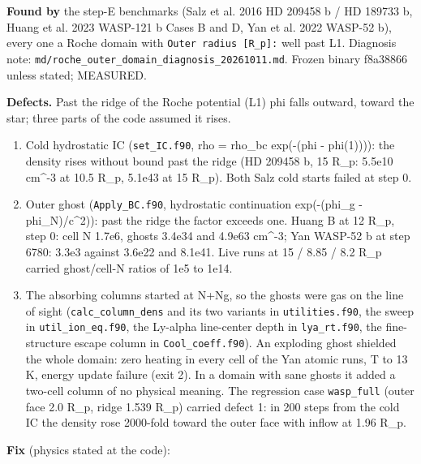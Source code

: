 \documentclass[english,a4paper]{my_memo}
\providecommand{\tightlist}{\setlength{\itemsep}{0pt}\setlength{\parskip}{0pt}}
\begin{document}
\textbf{Found by} the step-E benchmarks (Salz et al. 2016 HD 209458 b / HD 189733 b, Huang et al. 2023 WASP-121 b Cases B and D, Yan et al. 2022 WASP-52 b), every one a Roche domain with \texttt{Outer\ radius\ {[}R\_p{]}:} well past L1. Diagnosis note: \texttt{md/roche\_outer\_domain\_diagnosis\_20261011.md}. Frozen binary f8a38866 unless stated; MEASURED.

\textbf{Defects.} Past the ridge of the Roche potential (L1) phi falls outward, toward the star; three parts of the code assumed it rises.

\begin{enumerate}
\def\labelenumi{\arabic{enumi}.}
\tightlist
\item
  Cold hydrostatic IC (\texttt{set\_IC.f90}, rho = rho\_bc exp(-(phi - phi(1)))): the density rises without bound past the ridge (HD 209458 b, 15 R\_p: 5.5e10 cm\^{}-3 at 10.5 R\_p, 5.1e43 at 15 R\_p). Both Salz cold starts failed at step 0.
\item
  Outer ghost (\texttt{Apply\_BC.f90}, hydrostatic continuation exp(-(phi\_g - phi\_N)/c\^{}2)): past the ridge the factor exceeds one. Huang B at 12 R\_p, step 0: cell N 1.7e6, ghosts 3.4e34 and 4.9e63 cm\^{}-3; Yan WASP-52 b at step 6780: 3.3e3 against 3.6e22 and 8.1e41. Live runs at 15 / 8.85 / 8.2 R\_p carried ghost/cell-N ratios of 1e5 to 1e14.
\item
  The absorbing columns started at N+Ng, so the ghosts were gas on the line of sight (\texttt{calc\_column\_dens} and its two variants in \texttt{utilities.f90}, the sweep in \texttt{util\_ion\_eq.f90}, the Ly-alpha line-center depth in \texttt{lya\_rt.f90}, the fine-structure escape column in \texttt{Cool\_coeff.f90}). An exploding ghost shielded the whole domain: zero heating in every cell of the Yan atomic runs, T to 13 K, energy update failure (exit 2). In a domain with sane ghosts it added a two-cell column of no physical meaning.
  The regression case \texttt{wasp\_full} (outer face 2.0 R\_p, ridge 1.539 R\_p) carried defect 1: in 200 steps from the cold IC the density rose 2000-fold toward the outer face with inflow at 1.96 R\_p.
\end{enumerate}

\textbf{Fix} (physics stated at the code):
\end{document}
